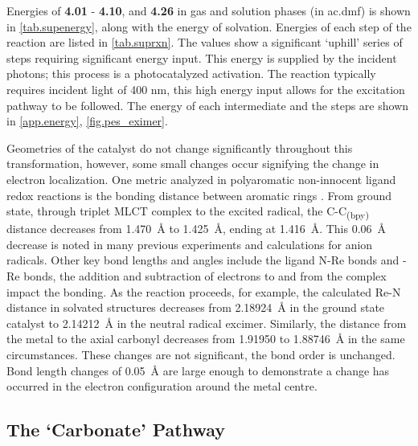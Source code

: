 Energies of \textbf{4.01} - \textbf{4.10}, and \textbf{4.26} in gas and solution phases (in \gls{ac.dmf}) is shown in \autoref{tab.supenergy}, along with the energy of solvation. Energies of each step of the reaction are listed in \autoref{tab.suprxn}. The values show a significant `uphill' series of steps requiring significant energy input. This energy is supplied by the incident photons; this process is a photocatalyzed activation. The reaction typically requires incident light of 400 nm\autocite{hawecker1983}, this high energy input allows for the excitation pathway to be followed. The energy of each intermediate and the steps are shown in \autoref{app.energy}, \autoref{fig.pes_eximer}.




Geometries of the catalyst do not change significantly throughout this transformation, however, some small changes occur signifying the change in electron localization. One metric analyzed in polyaromatic non-innocent ligand redox reactions is the bonding distance between aromatic rings \autocite{bokarev2014}. From ground state, through triplet MLCT complex to the excited radical, the C-C\textsubscript{(bpy)} distance decreases from 1.470~\r{A} to 1.425~\r{A}, ending at 1.416~\r{A}. This 0.06~\r{A} decrease is noted in many previous experiments and calculations for anion radicals\autocite{bokarev2014, chisholm1981, castellaventura2000, gorerandall2009, irwin2010}. Other key bond lengths and angles include the ligand N-Re bonds and -Re bonds, the addition and subtraction of electrons to and from the complex impact the bonding. As the reaction proceeds, for example, the calculated Re-N distance in solvated structures decreases from 2.18924~\r{A} in the ground state catalyst to 2.14212~\r{A} in the neutral radical excimer. Similarly, the distance from the metal to the axial carbonyl decreases from 1.91950 to 1.88746~\r{A} in the same circumstances. These changes are not significant, the bond order is unchanged. Bond length changes of 0.05~\r{A} are large enough to demonstrate a change has occurred in the electron configuration around the metal centre. 

\subsection{The `Carbonate' Pathway}\label{ss.carbonate}

